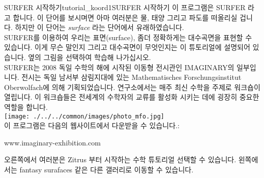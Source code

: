 \begin{surferIntroPage}{SURFER 시작하기}{tutorial_koord1}{SURFER 시작하기}
이 프로그램은 SURFER 라고 합니다. 이 단어를 보시며면 아마 여러분은 물, 태양 그리고 파도를 떠올리실 겁니다. 하지만 이 단어는 {\it surface} 라는 단어에서 유래하였습니다.
\\
SURFER를 이용하여 우리는 표면(surface), 좀더 정확하게는 대수곡면을 표현할 수 있습니다. 이게 무슨 말인지 그리고 대수곡면이 무엇인지는 이 튜토리얼에 설명되어 있습니다. 옆의 그림을 선택하여 학습해 나가십시오.\\
SURFER는 2008 독일 수학의 해에 시작된 이동형 전시관인 IMAGINARY의 일부입니다. 전시는 독일 남서부 삼림지대에 있는 Mathematisches Forschungsinstitut Oberwolfach에 의해 기획되었습니다. 연구소에서는 매주 최신 수학을 주제로 워크숍이 열립니다. 이 워크숍들은 전세계의 수학자의 교류를 활성화 시키는 데에 굉장히 중요한 역할을 합니다.\\
\vspace{0.2cm} \hspace{3.5cm}\texttt{[image: ./../../common/images/photo\_mfo.jpg]}\\
이 프로그램은 다음의 웹사이트에서 다운받을 수 있습니다.: \\
\begin{centering}
www.imaginary-exhibition.com\\
\end{centering}
 \vspace{0.2cm}
오른쪽에서 여러분은 Zitrus 부터 시작하는 수학 튜토리얼 선택할 수 있습니다. 왼쪽에서는 fantasy surafaces 같은 다른 갤러리로 이동할 수 있습니다.
\end{surferIntroPage}
